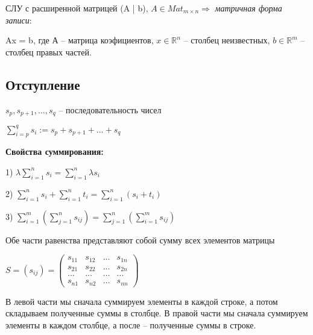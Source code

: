 СЛУ с расширенной матрицей (A | b), $A \in Mat_{m \times n}
\Rightarrow$ \textit{матричная форма записи}:

Ax = b, где А -- матрица коэфициентов, $x \in \mathbb{R}^n$ -- столбец неизвестных, $b \in \mathbb{R}^m$ -- столбец правых частей.

\vspace{\baselineskip}
\subsection{Отступление} 

$s_p, s_{p+1}, \dots, s_q$ -- последовательность чисел

$\sum\limits_{i=p}^q s_i := s_p + s_{p+1} + \dots + s_q$

\vspace{\baselineskip}
\textbf{Свойства суммирования: }

1) $\lambda \sum\limits_{i=1}^n s_i = \sum\limits_{i=1}^n \lambda s_i$

\vspace{\baselineskip}
2) $\sum\limits_{i=1}^n s_i + \sum\limits_{i=1}^n t_i = \sum\limits_{i=1}^n (s_i + t_i)$

\vspace{\baselineskip}
3) $\sum\limits_{i=1}^m ( \sum\limits_{j=1}^n s_{ij}) = \sum\limits_{j=1}^n ( \sum\limits_{i=1}^m s_{ij})$

Обе части равенства представляют собой сумму всех элементов матрицы 

$S = (s_{ij}) = \begin{pmatrix} s_{11} & s_{12} & \dots & s_{1n} \\
s_{21} & s_{22} & \dots & s_{2n} \\
\dots & \dots & \dots & \dots \\
s_{n1} & s_{n2} & \dots & s_{nn} \end{pmatrix}$ 

\vspace{\baselineskip}
В левой части мы сначала суммируем элементы в каждой строке, а потом складываем полученные суммы в столбце. В правой части мы сначала суммируем элементы в каждом столбце, а после -- полученные суммы в строке.

